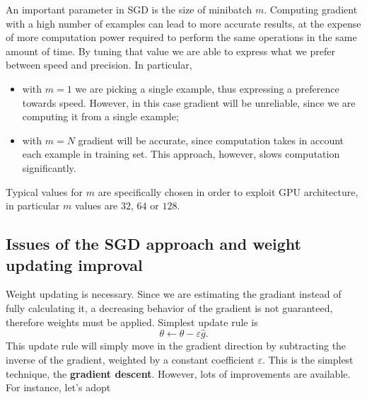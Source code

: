\documentclass[10pt]{report}
\begin{document}
An important parameter in SGD is the size of minibatch \(m\). Computing
gradient with a high number of examples can lead to more accurate
results, at the expense of more computation power required to perform
the same operations in the same amount of time. By tuning that value we
are able to express what we prefer between speed and precision. In
particular,

\begin{itemize}
\item with \(m = 1\) we are picking a single example, thus expressing a
preference towards speed. However, in this case gradient will be
unreliable, since we are computing it from a single example;
\item with \(m = N\) gradient will be accurate, since computation takes in
account each example in training set. This approach, however, slows
computation significantly.
\end{itemize}

Typical values for \(m\) are specifically chosen in order to exploit GPU
architecture, in particular \(m\) values are \(32\), \(64\) or \(128\).

\subsection{Issues of the SGD approach and weight updating improval}
\label{issues-of-the-sgd-approach-and-weight-updating-improval}
Weight updating is necessary. Since we are estimating the gradiant
instead of fully calculating it, a decreasing behavior of the gradient
is not guaranteed, therefore weights must be applied. Simplest update
rule is \[\theta \leftarrow \theta - \varepsilon \hat{g}.\] This update
rule will simply move in the gradient direction by subtracting the
inverse of the gradient, weighted by a constant coefficient
\(\varepsilon\). This is the simplest technique, the \textbf{gradient descent}.
However, lots of improvements are available. For instance, let's adopt
\end{document}
